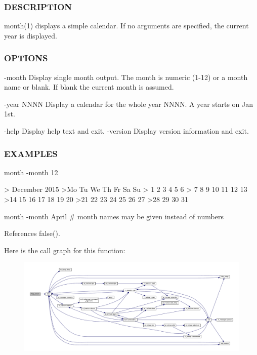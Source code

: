 \subsubsection*{D\+E\+S\+C\+R\+I\+P\+T\+I\+ON}

month(1) displays a simple calendar. If no arguments are specified, the current year is displayed.

\subsubsection*{O\+P\+T\+I\+O\+NS}

-\/month Display single month output. The month is numeric (1-\/12) or a month name or blank. If blank the current month is assumed.

-\/year N\+N\+NN Display a calendar for the whole year N\+N\+NN. A year starts on Jan 1st.

-\/help Display help text and exit. -\/version Display version information and exit.

\subsubsection*{E\+X\+A\+M\+P\+L\+ES}

\begin{DoxyVerb}   month -month 12

    >    December 2015
    >Mo Tu We Th Fr Sa Su
    >    1  2  3  4  5  6
    > 7  8  9 10 11 12 13
    >14 15 16 17 18 19 20
    >21 22 23 24 25 26 27
    >28 29 30 31

   month -month April # month names may be given instead of numbers \end{DoxyVerb}
 

References false().

Here is the call graph for this function\+:
\nopagebreak
\begin{figure}[H]
\begin{center}
\leavevmode
\includegraphics[width=350pt]{month_8f90_ae30c982fccb720f9edefdd837baed72a_cgraph}
\end{center}
\end{figure}
\mbox{\label{month_8f90_a25f7e0d0c91977505b956237e747f2bb}} 

